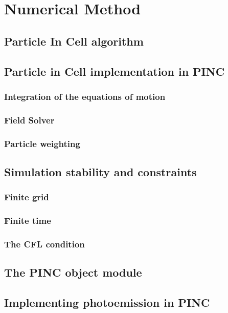 \chapter{Numerical Method}
\label{sec:methods}

\section{Particle In Cell algorithm}


\section{Particle in Cell implementation in PINC}
\subsection{Integration of the equations of motion}
\subsection{Field Solver}
\subsection{Particle weighting}

\section{Simulation stability and constraints}
\subsection{Finite grid}
\subsection{Finite time}
\subsection{The CFL condition}

\section{The PINC object module}
\subsection{}

\section{Implementing photoemission in PINC}
